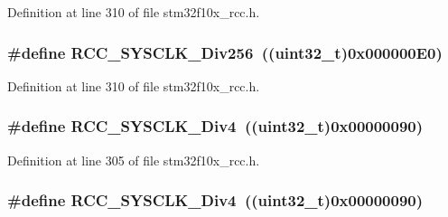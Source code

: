 Definition at line 310 of file stm32f10x\+\_\+rcc.\+h.

\subsubsection[{\texorpdfstring{R\+C\+C\+\_\+\+S\+Y\+S\+C\+L\+K\+\_\+\+Div256}{RCC_SYSCLK_Div256}}]{\setlength{\rightskip}{0pt plus 5cm}\#define R\+C\+C\+\_\+\+S\+Y\+S\+C\+L\+K\+\_\+\+Div256~(({\bf uint32\+\_\+t})0x000000\+E0)}\hypertarget{group___a_h_b__clock__source_gaa28bb876893b3267a813fc98a462d5ee}{}\label{group___a_h_b__clock__source_gaa28bb876893b3267a813fc98a462d5ee}


Definition at line 310 of file stm32f10x\+\_\+rcc.\+h.

\subsubsection[{\texorpdfstring{R\+C\+C\+\_\+\+S\+Y\+S\+C\+L\+K\+\_\+\+Div4}{RCC_SYSCLK_Div4}}]{\setlength{\rightskip}{0pt plus 5cm}\#define R\+C\+C\+\_\+\+S\+Y\+S\+C\+L\+K\+\_\+\+Div4~(({\bf uint32\+\_\+t})0x00000090)}\hypertarget{group___a_h_b__clock__source_ga458f8ae63164e878930dbebd7643f087}{}\label{group___a_h_b__clock__source_ga458f8ae63164e878930dbebd7643f087}


Definition at line 305 of file stm32f10x\+\_\+rcc.\+h.

\subsubsection[{\texorpdfstring{R\+C\+C\+\_\+\+S\+Y\+S\+C\+L\+K\+\_\+\+Div4}{RCC_SYSCLK_Div4}}]{\setlength{\rightskip}{0pt plus 5cm}\#define R\+C\+C\+\_\+\+S\+Y\+S\+C\+L\+K\+\_\+\+Div4~(({\bf uint32\+\_\+t})0x00000090)}\hypertarget{group___a_h_b__clock__source_ga458f8ae63164e878930dbebd7643f087}{}\label{group___a_h_b__clock__source_ga458f8ae63164e878930dbebd7643f087}


